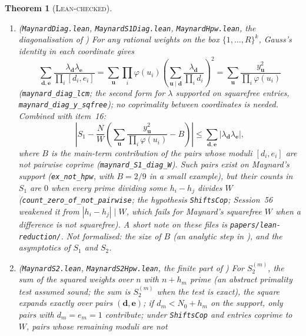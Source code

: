 \documentclass[11pt]{amsart}
\newtheorem{theorem}{Theorem}
\theoremstyle{definition}
\theoremstyle{remark}
\newcommand{\lbl}[1]{\textup{\textsc{#1}}}
\begin{document}
\begin{theorem}[\lbl{Lean-checked}]
\begin{enumerate}
\texttt{maynard\_}\allowbreak\texttt{S1\_error} that the entries $[d_i,e_i]$ are pairwise coprime, the same for the lists
$([d_i,e_i])$, $(d_i)$ and $(e_i)$ (\texttt{mu\_}\allowbreak\texttt{prod\_lcm}, \texttt{tmu\_}\allowbreak\texttt{lcm\_left},
\texttt{tmu\_}\allowbreak\texttt{lcm\_right}). These are the M\"obius identities the diagonalisation of $S_1$ uses; the
diagonalisation itself is not formalised.
\item (\texttt{MaynardDiag.lean}, \texttt{MaynardS1Diag.lean}, \texttt{MaynardHpw.lean}, the diagonalisation of
\cite[Lemma~5.1]{May15}) For any rational weights on the box $\{1,\dots,R\}^k$, Gauss's identity in each coordinate
gives
\[
\sum_{\mathbf d,\mathbf e}\frac{\lambda_{\mathbf d}\lambda_{\mathbf e}}{\prod_i[d_i,e_i]}
=\sum_{\mathbf u}\prod_i\varphi(u_i)\left(\sum_{\mathbf u\mid\mathbf d}\frac{\lambda_{\mathbf d}}{\prod_id_i}\right)^2
=\sum_{\mathbf u}\frac{y_{\mathbf u}^2}{\prod_i\varphi(u_i)}
\]
(\texttt{maynard\_}\allowbreak\texttt{diag\_lcm}; the second form for $\lambda$ supported on squarefree entries,
\texttt{maynard\_}\allowbreak\texttt{diag\_y\_sqfree}); no coprimality between coordinates is needed. Combined with item~16:
\[
\left|S_1-\frac NW\left(\sum_{\mathbf u}\frac{y_{\mathbf u}^2}{\prod_i\varphi(u_i)}-B\right)\right|\le\sum_{\mathbf d,\mathbf e}|\lambda_{\mathbf d}\lambda_{\mathbf e}|,
\]
where $B$ is the main-term contribution of the pairs whose moduli $[d_i,e_i]$ are not pairwise coprime
(\texttt{maynard\_}\allowbreak\texttt{S1\_diag\_W}). Such pairs exist on Maynard's support (\texttt{ex\_not\_hpw}, with $B=2/9$ in a small
example), but their counts in $S_1$ are $0$ when every prime dividing some $h_i-h_j$ divides $W$ (\texttt{count\_zero\_}\allowbreak\texttt{of\_not\_pairwise};
the hypothesis \texttt{ShiftsCop}; Session~56 weakened it from $|h_i-h_j|\mid W$, which fails for Maynard's squarefree $W$
when a difference is not squarefree). A short note on these files is \texttt{papers/}\allowbreak\texttt{lean-reduction/}.
Not formalised: the size of $B$ (an analytic step in \cite{May15}), and the asymptotics of $S_1$ and $S_2$.
\item (\texttt{MaynardS2.lean}, \texttt{MaynardS2Hpw.lean}, the finite part of \cite[Lemma~5.2]{May15}) For
$S_2^{(m)}$, the sum of the squared weights over $n$ with $n+h_m$ prime (an abstract primality test assumed sound; the sum is $S_2^{(m)}$ when the test is exact), the
square expands exactly over pairs $(\mathbf d,\mathbf e)$; if $d_m<N_0+h_m$ on the support, only pairs with
$d_m=e_m=1$ contribute; under \texttt{ShiftsCop} and entries coprime to $W$, pairs whose remaining moduli are not

\end{enumerate}
\end{theorem}
\end{document}
